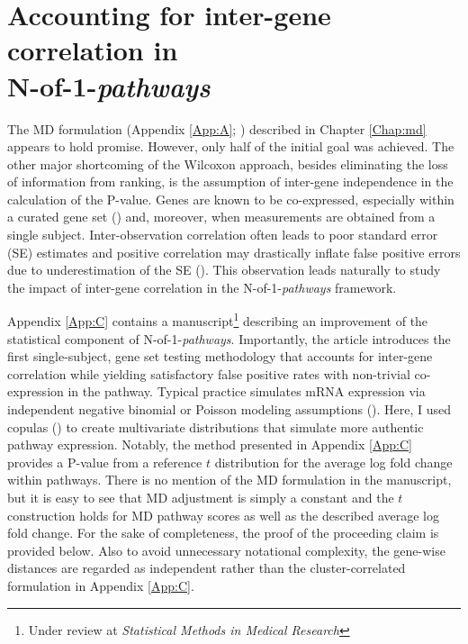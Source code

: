 \chapter{Accounting for inter-gene correlation in\\N-of-1-\emph{pathways}} \label{Chap:ct}

\indent \indent The MD formulation (Appendix \ref{App:A}; \cite{Schissler2015}) described in Chapter \ref{Chap:md} appears to hold promise. However, only half of the initial goal was achieved. The other major shortcoming of the Wilcoxon approach, besides eliminating the loss of information from ranking, is the assumption of inter-gene independence in the calculation of the P-value. Genes are known to be co-expressed, especially within a curated gene set (\cite{Tamayo2016}) and, moreover, when measurements are obtained from a single subject. Inter-observation correlation often leads to poor standard error (SE) estimates and positive correlation may drastically inflate false positive errors due to underestimation of the SE (\cite{Wu2012}). This observation leads naturally to study the impact of inter-gene correlation in the N-of-1-\emph{pathways} framework.

Appendix \ref{App:C} contains a manuscript\footnote{Under review at \emph{Statistical Methods in Medical Research}} describing an improvement of the statistical component of N-of-1-\emph{pathways}. Importantly, the article introduces the first single-subject, gene set testing methodology that accounts for inter-gene correlation while yielding satisfactory false positive rates with non-trivial co-expression in the pathway. Typical practice simulates mRNA expression via independent negative binomial or Poisson modeling assumptions (\cite{Gardeux2014}). Here, I used copulas (\cite{Genest2007,Yan2007}) to create multivariate distributions that simulate more authentic pathway expression. Notably, the method presented in Appendix \ref{App:C} provides a P-value from a reference $t$ distribution for the average log fold change within pathways. There is no mention of the MD formulation in the manuscript, but it is easy to see that MD adjustment is simply a constant and the $t$ construction holds for MD pathway scores as well as the described average log fold change. For the sake of completeness, the proof of the proceeding claim is provided below. Also to avoid unnecessary notational complexity, the gene-wise distances are regarded as independent rather than the cluster-correlated formulation in Appendix \ref{App:C}.

